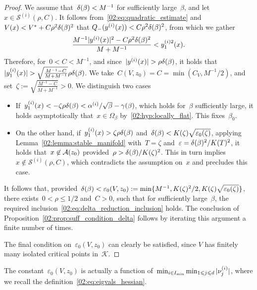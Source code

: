 \begin{proof}
                    We assume that~$\delta(\beta)<M^{-1}$ for sufficiently large~$\beta$, and let~$x\in \mathscr S^{(i)}(\rho,C)$.
                    It follows from~\eqref{02:eq:quadratic_estimate} and~$V(x)<V^* + C \rho^2\delta(\beta)^2$ that
                    $Q_{-}(y^{(i)}(x)) < C \rho^2\delta(\beta)^2$, from which we gather
                    \[\frac{M^{-1}|y^{(i)}(x)|^2-C\rho^2\delta(\beta)^2}{M+M^{-1}}<y_1^{(i)2}(x).\]
                    Therefore, for~$0<C<M^{-1}$, and since~$|y^{(i)}(x)|>\rho\largeRadius(\beta)$, it holds that~$|y_1^{(i)}(x)|>\sqrt{\frac{M^{-1}-C}{M+M^{-1}}}\rho\largeRadius(\beta)$.
                    We take~$C(V,z_0)=C=\min(C_V,M^{-1}/2)$, and set~$\zeta := \sqrt{\frac{M^{-1}-C}{M+M^{-1}}}>0 $.
                    We distinguish two cases
                    \begin{itemize}
                     \item{If~$y_1^{(i)}(x) < -\zeta \rho\delta(\beta)<\alpha^{(i)}/\sqrt\beta - \gamma(\beta)$, which holds for~$\beta$ sufficiently large, it holds asymptotically that~$x\in\Omega_\beta$ by~\eqref{02:hyp:locally_flat}. This fixes~$\beta_0$.}
                    \item{On the other hand, if~$y_1^{(i)}(x) >\zeta \rho\delta(\beta)$ and~$\delta(\beta)<K(\zeta)\sqrt{\varepsilon_0(\zeta)}$, applying Lemma~\ref{02:lemma:stable_manifold} with~$T=\zeta$ and~$\varepsilon = \delta(\beta)^2/K(T)^2$, it holds that~$x\not\in\mathcal{A}(z_0)$ provided~$\rho>\delta(\beta)/K(\zeta)^2$. This in turn implies~$x\not\in\mathscr S^{(i)}(\rho,C)$, which contradicts the assumption on~$x$ and precludes this case.}
                    \end{itemize}   
                    It follows that, provided~$\delta(\beta)< \varepsilon_0(V,z_0):=\min\{M^{-1},K(\zeta)^2/2,K(\zeta)\sqrt{\varepsilon_0(\zeta)}\}$, there exists~$0<\rho\leq1/2$ and~$C>0$, such that for sufficiently large~$\beta$, the required inclusion~\eqref{02:eq:delta_reduction_inclusion} holds.
                    The conclusion of Proposition~\ref{02:prop:suff_condition_delta} follows by iterating this argument a finite number of times.

                    The final condition on~$\varepsilon_0(V,z_0)$ can clearly be satisfied, since $V$ has finitely many isolated critical points in~$\mathcal K$.
            \end{proof}
            \begin{remark}
                The constant~$\varepsilon_0(V,z_0)$ is actually a function of~$\min_{i\in I_{\min}}\min_{1\leqslant j\leqslant d} |\nu^{(i)}_{j}|$, where we recall the definition~\eqref{02:eq:eigvals_hessian}.
            \end{remark}

